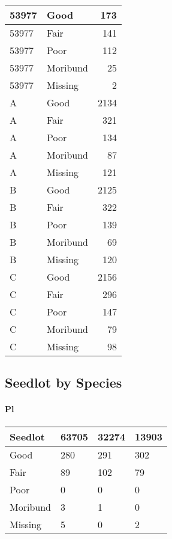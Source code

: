 \documentclass[
]{article}
\begin{document}
\begin{tabular}{l|l|r}
\hline
53977 & Good & 173\\
\hline
53977 & Fair & 141\\
\hline
53977 & Poor & 112\\
\hline
53977 & Moribund & 25\\
\hline
53977 & Missing & 2\\
\hline
A & Good & 2134\\
\hline
A & Fair & 321\\
\hline
A & Poor & 134\\
\hline
A & Moribund & 87\\
\hline
A & Missing & 121\\
\hline
B & Good & 2125\\
\hline
B & Fair & 322\\
\hline
B & Poor & 139\\
\hline
B & Moribund & 69\\
\hline
B & Missing & 120\\
\hline
C & Good & 2156\\
\hline
C & Fair & 296\\
\hline
C & Poor & 147\\
\hline
C & Moribund & 79\\
\hline
C & Missing & 98\\
\hline
\end{tabular}

\hypertarget{section-21}{%
\paragraph{}\label{section-21}}

\hypertarget{seedlot-by-species}{%
\subsection{Seedlot by Species}\label{seedlot-by-species}}

\hypertarget{pl}{%
\paragraph{Pl}\label{pl}}

\begin{tabular}{l|l|l|l}
\hline
Seedlot & 63705 & 32274 & 13903\\
\hline
Good & 280 & 291 & 302\\
\hline
Fair & 89 & 102 & 79\\
\hline
Poor & 0 & 0 & 0\\
\hline
Moribund & 3 & 1 & 0\\
\hline
Missing & 5 & 0 & 2\\
\hline
\end{tabular}
\end{document}
